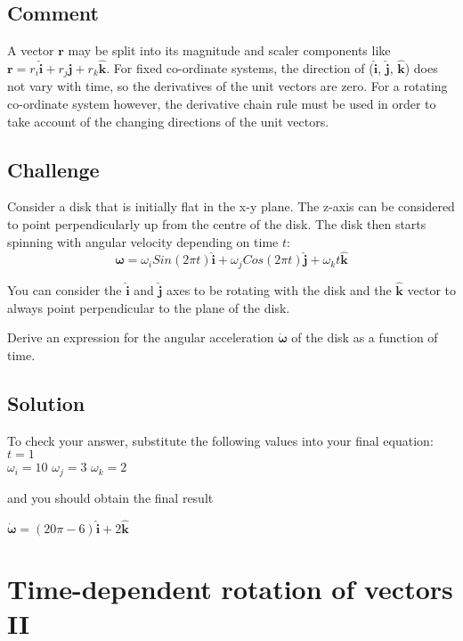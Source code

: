 \subsection*{Comment}
A vector $\bm{r}$ may be split into its magnitude and scaler components like $\bm{r} = r_i \bm{\hat{i}} + r_j \bm{\hat{j}} + r_k \bm{\hat{k}}$. For fixed co-ordinate systems, the direction of ($\bm{\hat{i}}$, $\bm{\hat{j}}$, $\bm{\hat{k}}$) does not vary with time, so the derivatives of the unit vectors are zero. For a rotating co-ordinate system however, the derivative chain rule must be used in order to take account of the changing directions of the unit vectors.

\subsection*{Challenge}
Consider a disk that is initially flat in the x-y plane. The z-axis can be considered to point perpendicularly up from the centre of the disk. The disk then starts spinning with angular velocity depending on time $t$:
\begin{equation}
    \bm{\omega} = \omega_i Sin(2 \pi t) \bm{\hat{i}} + \omega_j Cos(2 \pi t) \bm{\hat{j}} + \omega_k t \bm{\hat{k}}
\end{equation}

You can consider the $\bm{\hat{i}}$ and $\bm{\hat{j}}$ axes to be rotating with the disk and the $\bm{\hat{k}}$ vector to always point perpendicular to the plane of the disk. 

Derive an expression for the angular acceleration $\bm{\dot{\omega}}$ of the disk as a function of time.


\subsection*{Solution}
To check your answer, substitute the following values into your final equation:
$t=1$\\
$\omega_i=10$
$\omega_j=3$
$\omega_k=2$

and you should obtain the final result

$\bm{\dot{\omega}} = (20 \pi - 6) \bm{\hat{i}} + 2 \bm{\hat{k}}$




\newpage
\section{Time-dependent rotation of vectors II}

